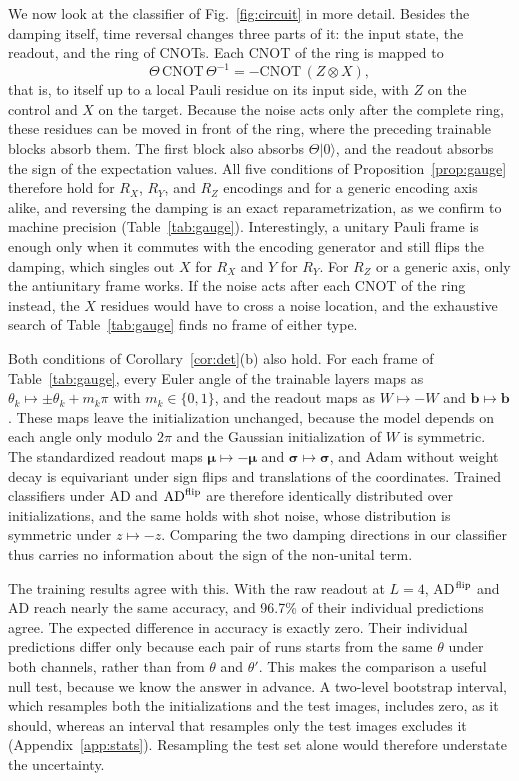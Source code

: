 \documentclass[
 aps,pra,
 twocolumn,
 superscriptaddress,
 longbibliography,
 nofootinbib
]{revtex4-2}
\providecommand{\ket}[1]{\lvert #1 \rangle}
\newcommand{\AD}{\mathrm{AD}}
\begin{document}
We now look at the classifier of Fig.~\ref{fig:circuit} in more detail.
Besides the damping itself, time reversal changes three parts of it: the input
state, the readout, and the ring of CNOTs. Each CNOT of the ring is mapped to
\begin{equation}
\Theta\,\mathrm{CNOT}\,\Theta^{-1}=-\mathrm{CNOT}\,(Z\otimes X),
\label{eq:theta_cnot}
\end{equation}
that is, to itself up to a local Pauli residue on its input side, with $Z$ on
the control and $X$ on the target. Because the noise acts only after the
complete ring, these residues can be moved in front of the ring, where the
preceding trainable blocks absorb them. The first block also absorbs
$\Theta\ket0$, and the readout absorbs the sign of the expectation values.
All five conditions of Proposition~\ref{prop:gauge} therefore hold for $R_X$,
$R_Y$, and $R_Z$ encodings and for a generic encoding axis alike, and reversing
the damping is an exact reparametrization, as we confirm to machine precision
(Table~\ref{tab:gauge}). Interestingly, a unitary Pauli frame is enough only when it commutes with
the encoding generator and still flips the damping, which singles out $X$ for
$R_X$ and $Y$ for $R_Y$. For $R_Z$ or a generic axis, only the antiunitary frame
works. If the noise acts after each CNOT of the ring
instead, the $X$ residues would have to cross a noise location, and the
exhaustive search of Table~\ref{tab:gauge} finds no frame of either type.

Both conditions of Corollary~\ref{cor:det}(b) also hold. For each frame of
Table~\ref{tab:gauge}, every Euler angle of the trainable layers maps as
$\theta_k\mapsto\pm\theta_k+m_k\pi$ with $m_k\in\{0,1\}$, and the readout maps
as $W\mapsto-W$ and $\mathbf b\mapsto\mathbf b$. These maps leave the
initialization unchanged, because the model depends on each angle only modulo
$2\pi$ and the Gaussian initialization of $W$ is symmetric. The standardized
readout maps $\boldsymbol\mu\mapsto-\boldsymbol\mu$ and
$\boldsymbol\sigma\mapsto\boldsymbol\sigma$, and Adam without weight decay is
equivariant under sign flips and translations of the coordinates. Trained
classifiers under $\AD$ and $\AD^{\rm flip}$ are therefore identically
distributed over initializations, and the same holds with shot noise, whose
distribution is symmetric under $z\mapsto-z$. Comparing the two damping
directions in our classifier thus carries no information about the sign of the
non-unital term.

The training results agree with this. With the raw readout at $L=4$,
AD$^{\rm flip}$ and AD reach nearly the same accuracy, and 96.7\% of their
individual predictions agree. The expected difference in accuracy is exactly
zero. Their individual
predictions differ only because each pair of runs starts from the same
$\theta$ under both channels, rather than from $\theta$ and $\theta'$. This
makes the comparison a useful null test, because we know the answer in
advance. A two-level bootstrap interval, which resamples both the
initializations and the test images, includes zero, as it should, whereas
an interval that resamples only the test images excludes it
(Appendix~\ref{app:stats}). Resampling the test set alone would therefore
understate the uncertainty.
\end{document}

